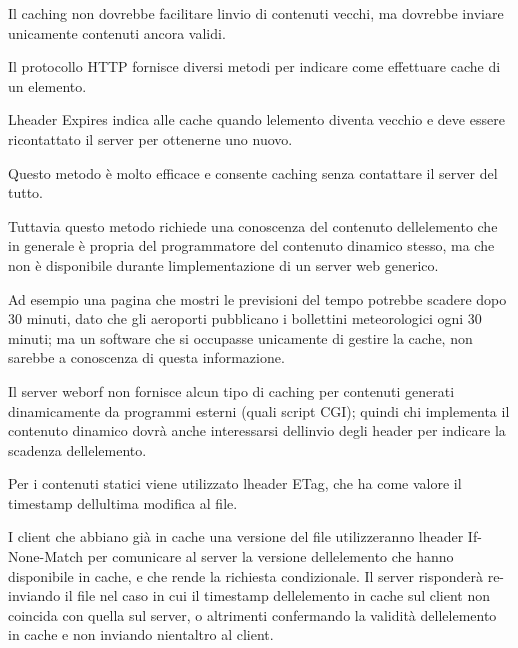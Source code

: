 \documentclass[a4paper,11pt]{article}
\begin{document}
{\sffamily
Il caching non dovrebbe facilitare l{\textquotesingle}invio di contenuti
vecchi, ma dovrebbe inviare unicamente contenuti ancora validi.}


\bigskip

{\sffamily
Il protocollo HTTP fornisce diversi metodi per indicare come effettuare
cache di un elemento.}


\bigskip

{\sffamily
L{\textquotesingle}header {\textquotedbl}Expires{\textquotedbl} indica
alle cache quando l{\textquotesingle}elemento diventa vecchio e deve
essere ricontattato il server per ottenerne uno nuovo.}

{\sffamily
Questo metodo \`e molto efficace e consente caching senza contattare il
server del tutto.}

{\sffamily
Tuttavia questo metodo richiede una conoscenza del contenuto
dell{\textquotesingle}elemento che in generale \`e propria del
programmatore del contenuto dinamico stesso, ma che non \`e disponibile
durante l{\textquotesingle}implementazione di un server web generico.}

{\sffamily
Ad esempio una pagina che mostri le previsioni del tempo potrebbe
scadere dopo 30 minuti, dato che gli aeroporti pubblicano i bollettini
meteorologici ogni 30 minuti; ma un software che si occupasse
unicamente di gestire la cache, non sarebbe a conoscenza di questa
informazione.}


\bigskip

{\sffamily
Il server weborf non fornisce alcun tipo di caching per contenuti
generati dinamicamente da programmi esterni (quali script CGI); quindi
chi implementa il contenuto dinamico dovr\`a anche interessarsi
dell{\textquotesingle}invio degli header per indicare la scadenza
dell{\textquotesingle}elemento.}


\bigskip

{\sffamily
Per i contenuti statici viene utilizzato l{\textquotesingle}header ETag,
che ha come valore il timestamp dell{\textquotesingle}ultima modifica
al file.}

{\sffamily
I client che abbiano gi\`a in cache una versione del file utilizzeranno
l{\textquotesingle}header If-None-Match per comunicare al server la
versione dell{\textquotesingle}elemento che hanno disponibile in cache,
e che rende la richiesta condizionale. Il server risponder\`a
re-inviando il file nel caso in cui il timestamp
dell{\textquotesingle}elemento in cache sul client non coincida con
quella sul server, o altrimenti confermando la validit\`a
dell{\textquotesingle}elemento in cache e non inviando
nient{\textquotesingle}altro al client.}
\end{document}
